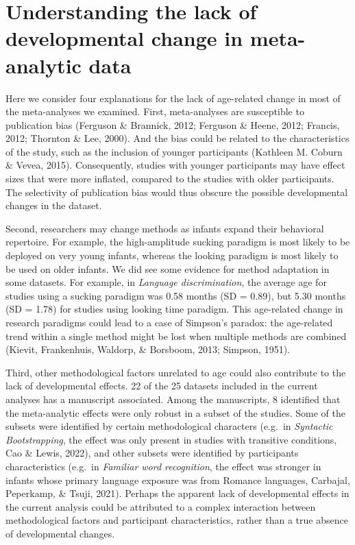 \documentclass[
  man]{apa6}
\begin{document}
\hypertarget{understanding-the-lack-of-developmental-change-in-meta-analytic-data}{%
\section{Understanding the lack of developmental change in meta-analytic data}\label{understanding-the-lack-of-developmental-change-in-meta-analytic-data}}

Here we consider four explanations for the lack of age-related change in most of the meta-analyses we examined. First, meta-analyses are susceptible to publication bias (Ferguson \& Brannick, 2012; Ferguson \& Heene, 2012; Francis, 2012; Thornton \& Lee, 2000). And the bias could be related to the characteristics of the study, such as the inclusion of younger participants (Kathleen M. Coburn \& Vevea, 2015). Consequently, studies with younger participants may have effect sizes that were more inflated, compared to the studies with older participants. The selectivity of publication bias would thus obscure the possible developmental changes in the dataset.

Second, researchers may change methods as infants expand their behavioral repertoire. For example, the high-amplitude sucking paradigm is most likely to be deployed on very young infants, whereas the looking paradigm is most likely to be used on older infants. We did see some evidence for method adaptation in some datasets. For example, in \emph{Language discrimination}, the average age for studies using a sucking paradigm was 0.58 months (SD = 0.89), but 5.30 months (SD = 1.78) for studies using looking time paradigm. This age-related change in research paradigms could lead to a case of Simpson's paradox: the age-related trend within a single method might be lost when multiple methods are combined (Kievit, Frankenhuis, Waldorp, \& Borsboom, 2013; Simpson, 1951).

Third, other methodological factors unrelated to age could also contribute to the lack of developmental effects. 22 of the 25 datasets included in the current analyses has a manuscript associated. Among the manuscripts, 8 identified that the meta-analytic effects were only robust in a subset of the studies. Some of the subsets were identified by certain methodological characters (e.g.~in \emph{Syntactic Bootstrapping}, the effect was only present in studies with transitive conditions, Cao \& Lewis, 2022), and other subsets were identified by participants characteristics (e.g.~in \emph{Familiar word recognition}, the effect was stronger in infants whose primary language exposure was from Romance languages, Carbajal, Peperkamp, \& Tsuji, 2021). Perhaps the apparent lack of developmental effects in the current analysis could be attributed to a complex interaction between methodological factors and participant characteristics, rather than a true absence of developmental changes.
\end{document}
